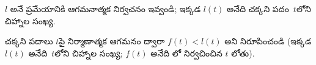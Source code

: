 \documentclass[../../../include/open-logic-section]{subfiles}
\begin{document}
\begin{prob}
  $l$ అనే ప్రమేయానికి ఆగమనాత్మక నిర్వచనం ఇవ్వండి; ఇక్కడ $l(t)$ అనేది చక్కని పదం~$t$లోని చిహ్నాల సంఖ్య.
\end{prob}

\begin{prob}
  చక్కని పదాలు $t$పై నిర్మాణాత్మక ఆగమనం ద్వారా $f(t) < l(t)$ అని నిరూపించండి (ఇక్కడ $l(t)$ అనేది~$t$లోని చిహ్నాల సంఖ్య; $f(t)$ అనేది లో నిర్వచించిన $t$ లోతు).
\end{prob}
\end{document}
